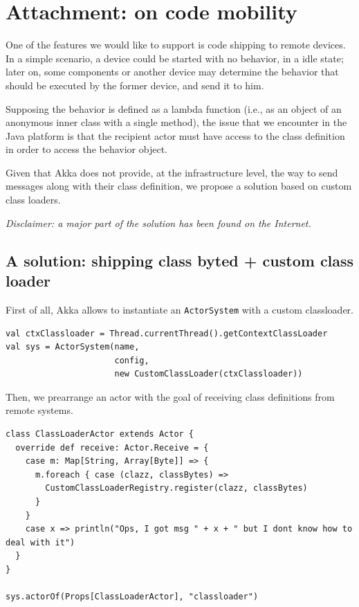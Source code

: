 \documentclass[11pt]{llncs}
\begin{document}
\newpage

\nocite{AkkaGuide}
\nocite{FPinScala}
\nocite{ScalaForTheImpatient}
\nocite{ScalaInDepth}




\newpage
\section{Attachment: on code mobility}

One of the features we would like to support is code shipping to remote devices. In a simple scenario, a device could be started with no behavior, in a idle state; later on, some components or another device may determine the behavior that should be executed by the former device, and send it to him.

Supposing the behavior is defined as a lambda function (i.e., as an object of an anonymous inner class with a single method), the issue that we encounter in the Java platform is that the recipient actor must have access to the class definition in order to access the behavior object.

Given that Akka does not provide, at the infrastructure level, the way to send messages along with their class definition, we propose a solution based on custom class loaders.

\emph{Disclaimer: a major part of the solution has been found on the Internet.}

\subsection{A solution: shipping class byted + custom class loader}

First of all, Akka allows to instantiate an \texttt{ActorSystem} with a custom classloader.

\begin{lstlisting}
val ctxClassloader = Thread.currentThread().getContextClassLoader
val sys = ActorSystem(name, 
                      config, 
                      new CustomClassLoader(ctxClassloader))
\end{lstlisting}

Then, we prearrange an actor with the goal of receiving class definitions from remote systems.

\begin{lstlisting}
class ClassLoaderActor extends Actor {
  override def receive: Actor.Receive = {
    case m: Map[String, Array[Byte]] => {
      m.foreach { case (clazz, classBytes) =>
        CustomClassLoaderRegistry.register(clazz, classBytes)
      }
    }
    case x => println("Ops, I got msg " + x + " but I dont know how to deal with it")
  }
}

sys.actorOf(Props[ClassLoaderActor], "classloader")
\end{lstlisting}
\end{document}
